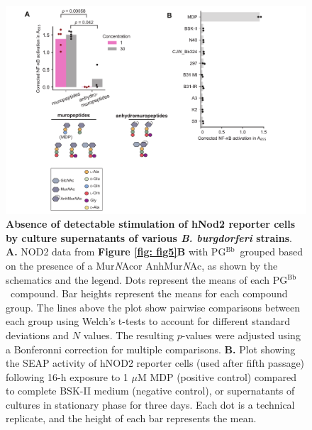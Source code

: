 \documentclass[twoside, watermark]{zHenriquesLab-StyleBioRxiv}
\newcommand{\tmu}{$\mu$} %
\newcommand{\pgbb}{PG$^\text{Bb}$}
\newcommand{\NAM}{Mur\textit{N}Ac}
\newcommand{\AnhNAM}{AnhMur\textit{N}Ac}
\begin{document}
\pagebreak
\begin{figure}[ht!]
    \centering
    \includegraphics[width = \textwidth]{Figures/Figure_S11_Bb_supernatant_is_inert_against_NOD2.pdf}
    \caption{\textbf{Absence of detectable stimulation of hNod2 reporter cells by culture supernatants of various \textit{B. burgdorferi} strains}. \textbf{A.} NOD2 data from \textbf{Figure \ref{fig: fig5}B} with \pgbb~grouped based on the presence of a \NAM or \AnhNAM, as shown by the schematics and the legend. Dots represent the means of each \pgbb~compound. Bar heights represent the means for each compound group. The lines above the plot show pairwise comparisons between each group using Welch’s t-tests to account for different standard deviations and $N$ values. The resulting $p$-values were adjusted using a Bonferonni correction for multiple comparisons.  \textbf{B.} Plot showing the SEAP activity of hNOD2 reporter cells (used after fifth passage) following 16-h exposure to 1 \tmu M MDP (positive control) compared to complete BSK-II medium (negative control), or supernatants of cultures in stationary phase for three days. Each dot is a technical replicate, and the height of each bar represents the mean.}
    \label{fig: figS11}
\end{figure}
\end{document}

